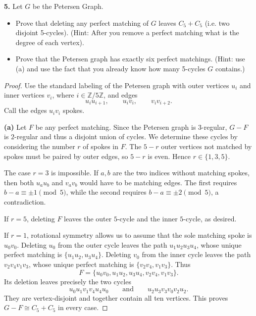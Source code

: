\documentclass[12pt]{amsart}
\theoremstyle{conjecture}
\theoremstyle{definition}
\theoremstyle{question}
\theoremstyle{theorem}
\begin{document}
    \noindent\textbf{5.} Let $G$ be the Petersen Graph.
    \begin{itemize}
        \item[(a)] Prove that deleting any perfect matching of $G$ leaves $C_5 + C_5$ (i.e. two disjoint 5-cycles).
        (Hint: After you remove a perfect matching what is the degree of each vertex).
        \item[(b)] Prove that the Petersen graph has exactly six perfect matchings.
        (Hint: use (a) and use the fact that you already know how many 5-cycles $G$ contains.)
    \end{itemize}

    \begin{proof}
        Use the standard labeling of the Petersen graph with outer
        vertices $u_i$ and inner vertices $v_i$, where
        $i\in\mathbb Z/5\mathbb Z$, and edges
        \[
            u_iu_{i+1},\qquad u_iv_i,\qquad v_iv_{i+2}.
        \]
        Call the edges $u_iv_i$ spokes.

        \smallskip
        \noindent\textbf{(a)} Let $F$ be any perfect matching.
        Since the Petersen graph is $3$-regular, $G-F$ is
        $2$-regular and thus a disjoint union of cycles.
        We determine these cycles by considering the number $r$
        of spokes in $F$. The $5-r$ outer vertices not matched by
        spokes must be paired by outer edges, so $5-r$ is even.
        Hence $r\in\{1,3,5\}$.

        The case $r=3$ is impossible. If $a,b$ are the two indices
        without matching spokes, then both $u_au_b$ and $v_av_b$
        would have to be matching edges. The first requires
        $b-a\equiv\pm1\pmod 5$, while the second requires
        $b-a\equiv\pm2\pmod 5$, a contradiction.

        If $r=5$, deleting $F$ leaves the outer $5$-cycle and the
        inner $5$-cycle, as desired.

        If $r=1$, rotational symmetry allows us to assume that
        the sole matching spoke is $u_0v_0$. Deleting $u_0$ from
        the outer cycle leaves the path $u_1u_2u_3u_4$, whose
        unique perfect matching is $\{u_1u_2,u_3u_4\}$.
        Deleting $v_0$ from the inner cycle leaves the path
        $v_2v_4v_1v_3$, whose unique perfect matching is
        $\{v_2v_4,v_1v_3\}$. Thus
        \[
            F=\{u_0v_0,u_1u_2,u_3u_4,v_2v_4,v_1v_3\}.
        \]
        Its deletion leaves precisely the two cycles
        \[
            u_0u_1v_1v_4u_4u_0
            \qquad\text{and}\qquad
            u_2u_3v_3v_0v_2u_2.
        \]
        They are vertex-disjoint and together contain all ten
        vertices. This proves $G-F\cong C_5+C_5$ in every case.


\end{proof}
\end{document}
